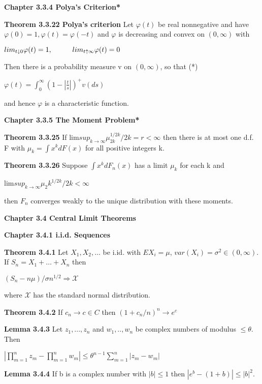 \documentclass{article}
\newcommand\tab[1][1cm]{\hspace*{#1}}
\begin{document}
\textbf {Chapter 3.3.4 Polya's Criterion*}

\textbf {Theorem 3.3.22 Polya's criterion} Let $\varphi(t)$ be real nonnegative and have $\varphi(0) = 1, \varphi(t) = \varphi(-t)$ and $\varphi$ is decreasing and convex on $(0, \infty)$ with
\begin{center}
$lim_{t \downarrow 0} \varphi(t) = 1, \tab lim_{t \uparrow \infty} \varphi(t) = 0$
\end{center}
Then there is a probability measure v on $(0, \infty)$, so that
(*) \begin{center}
$\varphi(t) = \int_{0}^{\infty} (1 - | \frac{t}{s}|)^+ v(ds)$
\end{center}
and hence $\varphi$ is a characteristic function.

\textbf {Chapter 3.3.5 The Moment Problem*}

\textbf {Theorem 3.3.25} If lim$sup_{k \to \infty} \mu_{2k}^{1/2k} / 2k = r < \infty$ then there is at most one d.f. F with $\mu_k = \int x^k dF(x)$ for all positive integers k.

\textbf {Theorem 3.3.26} Suppose $\int x^k dF_n(x)$ has a limit $\mu_k$ for each k and 
\begin{center}
lim$sup_{k \to \infty} \mu_2k^{1/2k} / 2k < \infty$
\end{center}
then $F_n$ converges weakly to the unique distribution with these moments.

\textbf {Chapter 3.4 Central Limit Theorems}

\textbf {Chapter 3.4.1 i.i.d. Sequences}

\textbf {Theorem 3.4.1} Let $X_1 , X_2 ,...$ be i.id. with $EX_i = \mu$, $var(X_i) = \sigma^2 \in (0, \infty)$. If $S_n = X_1 + \dots + X_n$ then 
\begin{center}
$(S_n - n \mu) / \sigma n^{1/2} \Rightarrow \mathcal{X}$
\end{center}
where $\mathcal{X}$ has the standard normal distribution.

\textbf {Theorem 3.4.2} If $c_n \rightarrow c \in C$ then $(1 + c_n /n)^n \rightarrow e^c$

\textbf {Lemma 3.4.3} Let $z_1 ,..., z_n$ and $w_1 ,.., w_n$ be complex numbers of modulus $\leq \theta$. Then
\begin{center}
$| \prod_{m=1}^n z_m - \prod_{m=1}^n w_m | \leq \theta^{n-1} \sum_{m=1}^{n} |z_m - w_m|$
\end{center}

\textbf {Lemma 3.4.4} If b is a complex number with $|b| \leq 1$ then $|e^b - (1 + b)| \leq |b|^2$.
\end{document}

